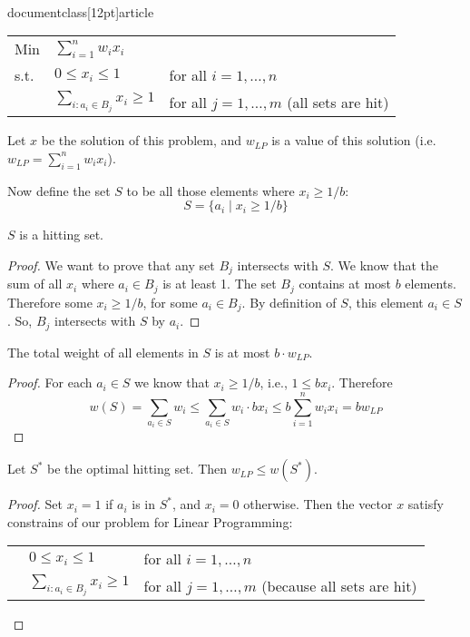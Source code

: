 \\documentclass[12pt]{article}
\begin{document}
\begin{enumerate}
{\begin{tabular}{lll}
  Min   & $\sum\limits_{i=1}^n w_i x_i$ \\
  s.t.
        & $0\le x_i \le 1$  & for all $i=1,\dots, n$ \\
        & $\sum\limits_{i:a_i\in B_j} x_i \ge 1$ & for all $j=1,\dots, m$  (all sets
        are hit) \\
\end{tabular}

Let $x$ be the solution of this problem, and $w_{LP}$ is a value of
this solution (i.e. $w_{LP}=\sum_{i=1}^n w_i x_i$).

Now define the set $S$ to be all
those elements where $x_i \ge 1/b$:
$$ S = \{ a_i \mid  x_i \ge 1/b \}$$

\begin{claim}
  $S$ is a hitting set.
\end{claim}

\begin{proof}
  We want to prove that any set $B_j$ intersects with $S$.
  We know that the sum of all $x_i$ where $a_i \in B_j$ is at least 1.
  The set $B_j$ contains at most $b$ elements.
  Therefore some $x_i \ge 1/b$, for some $a_i \in B_j$.
  By definition of $S$, this element $a_i \in S$.
  So, $B_j$ intersects with $S$ by $a_i$.
\end{proof}

\begin{claim}
  The total weight of all elements in $S$ is at most $b \cdot w_{LP}$.
\end{claim}

\begin{proof}
  For each $a_i\in S$ we know that $x_i \ge 1/b$, i.e., $1\le bx_i$.
  Therefore
  $$w(S) = \sum_{a_i\in S} w_i \le \sum_{a_i\in S} w_i \cdot b x_i \le
  b \sum_{i=1}^n w_i x_i = b w_{LP}$$
\end{proof}


\begin{claim}
  Let $S^*$ be the optimal hitting set. Then  $w_{LP} \le w(S^*)$.
\end{claim}

\begin{proof}
  Set $x_i=1$ if $a_i$ is in $S^*$, and $x_i=0$ otherwise.
  Then the vector $x$ satisfy constrains of our problem for Linear Programming:


\begin{tabular}{lll}
        & $0\le x_i \le 1$  & for all $i=1,\dots, n$ \\
        & $\sum\limits_{i:a_i\in B_j} x_i \ge 1$ & for all $j=1,\dots, m$
        (because all sets  are hit) \\
\end{tabular}


\end{proof}}
\end{enumerate}
\end{document}
